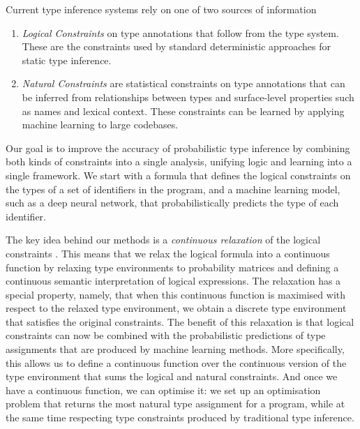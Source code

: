 \documentclass[acmsmall, review, anonymous]{acmart}\settopmatter{printfolios=true,printccs=false,printacmref=false}
\begin{document}
Current type inference systems rely
on one of two sources of information
\begin{enumerate}[label=(\Roman*)]
	\item \emph{Logical Constraints} on type annotations that follow from the type system.
	      These are the constraints used by standard deterministic approaches for static type inference.
	\item \emph{Natural Constraints} are statistical constraints on type annotations
	      that can be inferred from relationships between types and surface-level properties such as names and lexical context.
	      These constraints can be learned by applying machine learning to large codebases.
\end{enumerate}
Our goal is to improve the accuracy of probabilistic type
inference by combining both kinds of constraints into a single analysis, unifying logic and learning into a single framework.
We start with a formula that defines the logical constraints on the types of a set of identifiers in the program,
and a machine learning model, such as a deep neural network, that probabilistically predicts the type of each identifier.

The key idea behind our methods is a
\emph{continuous relaxation} of
the logical constraints \cite{hajek98}.
This means that we relax the logical formula into a continuous function by relaxing type environments
to probability matrices and defining
a continuous semantic interpretation of logical expressions.
The relaxation has a special property, namely,
that when this continuous function is maximised with respect
to the relaxed type environment, we obtain a discrete type environment
that satisfies the original constraints.
The benefit of this relaxation is that logical constraints
can now be combined with the probabilistic
predictions of type assignments that are
produced by machine learning methods.
More specifically, this allows us to define a continuous function over the continuous version of the type environment
that sums the logical and natural constraints.
And once we have a continuous function, we can optimise it:
we set up an optimisation problem that returns the most natural type assignment for a
program, while at the same time respecting type constraints produced by traditional type inference.
\end{document}
